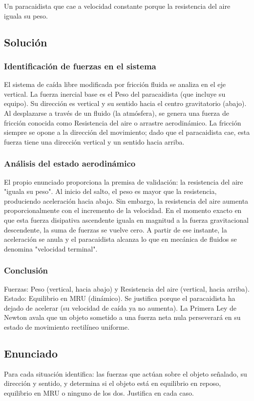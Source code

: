 \documentclass[12pt, a4paper]{article}
\begin{document}
Un paracaidista que cae a velocidad constante porque la resistencia del aire iguala su peso.

\subsection*{Solución}

\subsubsection*{Identificación de fuerzas en el sistema}
El sistema de caída libre modificada por fricción fluida se analiza en el eje vertical.
La fuerza inercial base es el Peso del paracaidista (que incluye su equipo). Su dirección es vertical y su sentido hacia el centro gravitatorio (abajo).
Al desplazarse a través de un fluido (la atmósfera), se genera una fuerza de fricción conocida como Resistencia del aire o arrastre aerodinámico. La fricción siempre se opone a la dirección del movimiento; dado que el paracaidista cae, esta fuerza tiene una dirección vertical y un sentido hacia arriba.

\subsubsection*{Análisis del estado aerodinámico}
El propio enunciado proporciona la premisa de validación: la resistencia del aire "iguala su peso". Al inicio del salto, el peso es mayor que la resistencia, produciendo aceleración hacia abajo. Sin embargo, la resistencia del aire aumenta proporcionalmente con el incremento de la velocidad. En el momento exacto en que esta fuerza disipativa ascendente iguala en magnitud a la fuerza gravitacional descendente, la suma de fuerzas se vuelve cero. A partir de ese instante, la aceleración se anula y el paracaidista alcanza lo que en mecánica de fluidos se denomina "velocidad terminal".

\subsubsection*{Conclusión}
Fuerzas: Peso (vertical, hacia abajo) y Resistencia del aire (vertical, hacia arriba).
Estado: Equilibrio en MRU (dinámico). Se justifica porque el paracaidista ha dejado de acelerar (su velocidad de caída ya no aumenta). La Primera Ley de Newton avala que un objeto sometido a una fuerza neta nula perseverará en su estado de movimiento rectilíneo uniforme.

\newpage
\subsection*{Enunciado}
Para cada situación identifica: las fuerzas que actúan sobre el objeto señalado, su dirección y sentido, y determina si el objeto está en equilibrio en reposo, equilibrio en MRU o ninguno de los dos. Justifica en cada caso.
\end{document}
